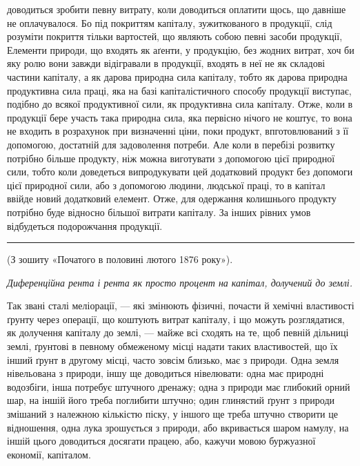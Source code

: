 \parcont{}  %
доводиться зробити певну витрату, коли доводиться оплатити щось, що давніше
не оплачувалося. Бо під покриттям капіталу, зужиткованого в продукції, слід
розуміти покриття тільки вартостей, що являють собою певні засоби продукції,
Елементи природи, що входять як аґенти, у продукцію, без жодних витрат,
хоч би яку ролю вони завжди відігравали в продукції, входять в неї не як складові
частини капіталу, а як дарова природна сила капіталу, тобто як дарова природна
продуктивна сила праці, яка на базі капіталістичного способу продукції
виступає, подібно до всякої продуктивної сили, як продуктивна сила капіталу.
Отже, коли в продукції бере участь така природна сила, яка первісно
нічого не коштує, то вона не входить в розрахунок при визначенні ціни, поки
продукт, впготовлюваний з її допомогою, достатній для задоволення потреби.
Але коли в перебізі розвитку потрібно більше продукту, ніж можна виготувати
з допомогою цієї природної сили, тобто коли доведеться випродукувати
цей додатковий продукт без допомоги цієї природної сили, або з допомогою
людини, людської праці, то в капітал ввійде новий додатковий елемент. Отже,
для одержання колишнього продукту потрібно буде відносно більшої витрати
капіталу. За інших рівних умов відбудеться подорожчання продукції.

\pfbreak

(З зошиту «Початого в половині лютого 1876 року»).

\noindent{}\emph{Диференційна рента і рента як просто процент на капітал,
долучений до землі.}

\noindent{}Так звані сталі меліорації, — які змінюють фізичні, почасти й хемічні
властивості ґрунту через операції, що коштують витрат капіталу, і що можуть
розглядатися, як долучення капіталу до землі, — майже всі сходять на те,
щоб певній дільниці землі, ґрунтові в певному обмеженому місці надати таких
властивостей, що їх інший ґрунт в другому місці, часто зовсім близько, має
з природи. Одна земля нівельована з природи, іншу ще доводиться нівелювати:
одна має природні водозбіги, інша потребує штучного дренажу; одна з природи
має глибокий орний шар, на іншій його треба поглибити штучно; один глинястий
ґрунт з природи змішаний з належною кількістю піску, у іншого ще
треба штучно створити це відношення, одна лука зрошується з природи, або
вкривається шаром намулу, на іншій цього доводиться досягати працею, або,
кажучи мовою буржуазної економії, капіталом.


